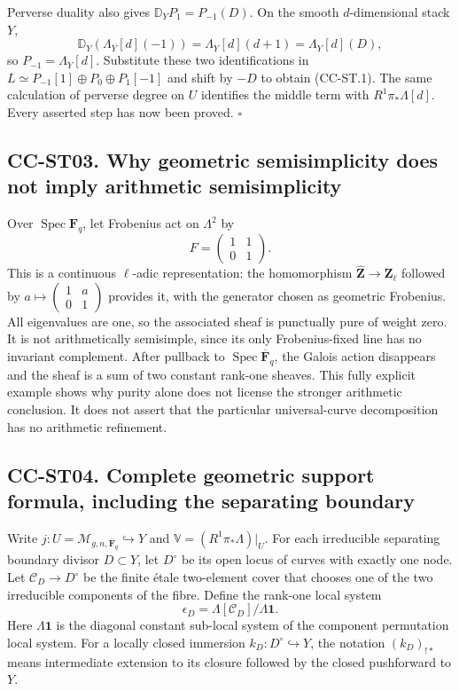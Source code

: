 \documentclass[11pt,a4paper]{article}
\theoremstyle{definition}\newtheorem{definition}[theorem]{Definition}
\theoremstyle{remark}\newtheorem{remark}[theorem]{Remark}
\begin{document}
Perverse duality also gives \(\mathbb D_YP_1=P_{-1}(D)\). On the smooth
\(d\)-dimensional stack \(Y\), \[
\mathbb D_Y(\Lambda_Y[d](-1))=\Lambda_Y[d](d+1)=\Lambda_Y[d](D),
\] so \(P_{-1}=\Lambda_Y[d]\). Substitute these two identifications in
\(L\simeq P_{-1}[1]\oplus P_0\oplus P_1[-1]\) and shift by \(-D\) to
obtain (CC-ST.1). The same calculation of perverse degree on \(U\)
identifies the middle term with \(R^1\pi_*\Lambda[d]\). Every asserted
step has now been proved. \(\square\)

\subsection{CC-ST03. Why geometric semisimplicity does not imply
arithmetic
semisimplicity}\label{cc-st03.-why-geometric-semisimplicity-does-not-imply-arithmetic-semisimplicity}

Over \(\operatorname{Spec}\mathbf F_q\), let Frobenius act on
\(\Lambda^2\) by \[
F=\begin{pmatrix}1&1\\0&1\end{pmatrix}.
\] This is a continuous \(\ell\)-adic representation: the homomorphism
\(\widehat{\mathbf Z}\to\mathbf Z_\ell\) followed by
\(a\mapsto\left(\begin{smallmatrix}1&a\\0&1\end{smallmatrix}\right)\)
provides it, with the generator chosen as geometric Frobenius. All
eigenvalues are one, so the associated sheaf is punctually pure of
weight zero. It is not arithmetically semisimple, since its only
Frobenius-fixed line has no invariant complement. After pullback to
\(\operatorname{Spec}\overline{\mathbf F}_q\), the Galois action
disappears and the sheaf is a sum of two constant rank-one sheaves. This
fully explicit example shows why purity alone does not license the
stronger arithmetic conclusion. It does not assert that the particular
universal-curve decomposition has no arithmetic refinement.

\subsection{CC-ST04. Complete geometric support formula, including the
separating
boundary}\label{cc-st04.-complete-geometric-support-formula-including-the-separating-boundary}

Write \(j:U=\mathcal M_{g,n,\overline{\mathbf F}_q}\hookrightarrow Y\)
and \(\mathbb V=(R^1\pi_*\Lambda)|_U\). For each irreducible separating
boundary divisor \(D\subset Y\), let \(D^\circ\) be its open locus of
curves with exactly one node. Let \(\mathcal C_D\to D^\circ\) be the
finite étale two-element cover that chooses one of the two irreducible
components of the fibre. Define the rank-one local system \[
\epsilon_D=\Lambda[\mathcal C_D]/\Lambda\mathbf 1.
\] Here \(\Lambda\mathbf1\) is the diagonal constant sub-local system of
the component permutation local system. For a locally closed immersion
\(k_D:D^\circ\hookrightarrow Y\), the notation \((k_D)_{!*}\) means
intermediate extension to its closure followed by the closed pushforward
to \(Y\).
\end{document}
